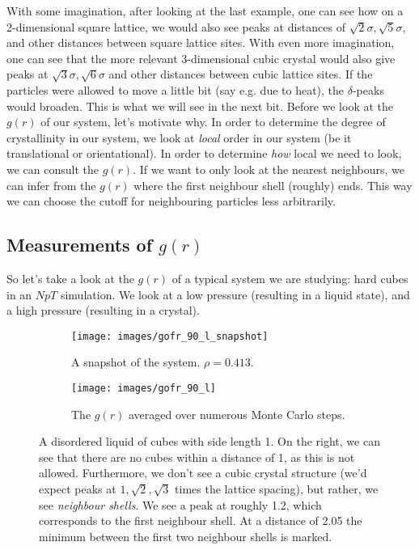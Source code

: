 \documentclass[thesis]{subfiles}
\begin{document}
With some imagination, after looking at the last example, one can see how on a 2-dimensional square lattice, we would also see peaks at distances of $\sqrt 2\sigma, \sqrt 5\sigma$, and other distances between square lattice sites. With even more imagination, one can see that the more relevant 3-dimensional cubic crystal would also give peaks at $\sqrt 3 \sigma, \sqrt 6 \sigma$ and other distances between cubic lattice sites.
If the particles were allowed to move a little bit (say e.g. due to heat), the $\delta$-peaks would broaden. This is what we will see in the next bit.
\bigbreak
Before we look at the $g(r)$ of our system, let's motivate why. In order to determine the degree of crystallinity in our system, we look at \emph{local} order in our system (be it translational or orientational). In order to determine \emph{how} local we need to look, we can consult the $g(r)$. If we want to only look at the nearest neighbours, we can infer from the $g(r)$ where the first neighbour shell (roughly) ends. This way we can choose the cutoff for neighbouring particles less arbitrarily.

\subsection{Measurements of \texorpdfstring{$g(r)$}{g(r)}}

So let's take a look at the $g(r)$ of a typical system we are studying: hard cubes in an $NpT$ simulation. We look at a low pressure (resulting in a liquid state), and a high pressure (resulting in a crystal).

\begin{figure}[h]
\begin{subfigure}{0.4\textwidth}
	\centering
	\vspace{8pt}
	\texttt{[image: images/gofr\_90\_l\_snapshot]}
	\vspace{10pt}
	\caption{A snapshot of the system. $\rho = 0.413$.}
\end{subfigure}
\begin{subfigure}{0.6\textwidth}
	\centering
	\texttt{[image: images/gofr\_90\_l]}
	\caption{The $g(r)$ averaged over numerous Monte Carlo steps.}
\end{subfigure}
\caption{A disordered liquid of cubes with side length 1. On the right, we can see that there are no cubes within a distance of 1, as this is not allowed. Furthermore, we don't see a cubic crystal structure (we'd expect peaks at $1, \sqrt 2, \sqrt 3$ times the lattice spacing), but rather, we see \emph{neighbour shells}. We see a peak at roughly 1.2, which corresponds to the first neighbour shell. At a distance of 2.05 the minimum between the first two neighbour shells is marked.}
\end{figure}
\end{document}
